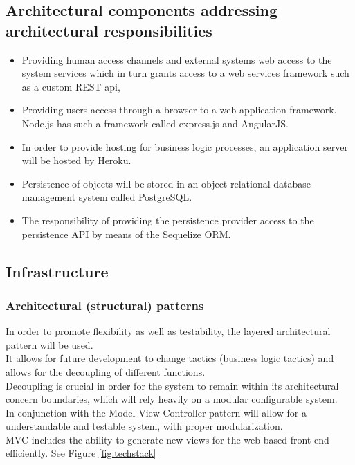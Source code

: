 \documentclass{article}
\begin{document}
	\subsection{Architectural components addressing architectural responsibilities}
		\begin{itemize}
		\item Providing human access channels and external systems web access to the system services which in turn grants access to a web services framework such as a custom REST api,
		\item Providing users access through a browser to a web application framework. Node.js has such a framework called express.js and AngularJS.
		\item In order to provide hosting for business logic processes, an application server will be hosted by Heroku.
		\item Persistence of objects will be stored in an object-relational database management system called PostgreSQL.
		\item The responsibility of providing the persistence provider access to the persistence API by means of the Sequelize ORM.
		\end{itemize}

	\subsection{Infrastructure}
	\subsubsection{Architectural (structural) patterns}
	In order to promote flexibility as well as testability, the layered architectural pattern will be used.\\	 It allows for future development to change tactics (business logic tactics) and allows for the decoupling of different functions. \\ Decoupling is crucial in order for the system to remain within its architectural concern boundaries, which will rely heavily on a modular configurable system.\\ In conjunction with the Model-View-Controller pattern will allow for a understandable and testable system, with proper modularization.\\ MVC includes the ability to generate new views for the web based front-end efficiently. See Figure \ref{fig:techstack}
	
\end{document}
